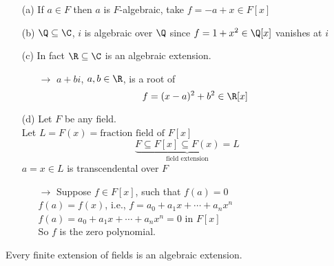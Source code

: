 \ex\begin{itemize}
\item[(a)] If $a\in F$ then $a$ is $F$-algebraic, take $f=-a+x\in F[x]$
\item[(b)] $\Q\subseteq\C$, $i$ is algebraic over $\Q$ since $f=1+x^2\in\Q[x]$ vanishes at $i$
\item[(c)] In fact $\R\subseteq\C$ is an algebraic extension.
\begin{itemize}
\item[$\to$] $a+bi$, $a,b\in\R$, is a root of
\[ f = (x-a)^2 + b^2 \in \R[x] \]
\end{itemize}
\item[(d)] Let $F$ be any field. \\
Let $L=F(x)=\text{fraction field of $F[x]$}$
\[ \underbrace{F \subseteq F[x] \subseteq F(x) = L}_{\text{field extension}} \]
$a=x\in L$ is transcendental over $F$
\begin{itemize}
\item[$\to$] Suppose $f\in F[x]$, such that $f(a)=0$\footnotemark \\
$f(a)=f(x)$, i.e., $f=a_0+a_1x+\dotsb+a_nx^n$ \\
$f(a)=a_0+a_1x+\dotsb+a_nx^n=0$ in $F[x]$ \\
So $f$ is the zero polynomial.
\end{itemize}
\end{itemize}
\thm Every finite extension of fields is an algebraic extension.
